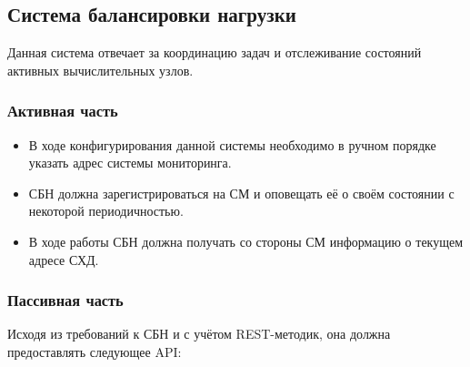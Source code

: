 \documentclass[a4paper,12pt]{report}
\numberwithin{equation}{section}
\begin{document}
  \subsection{Система балансировки нагрузки}
  Данная система отвечает за координацию задач и отслеживание состояний активных вычислительных узлов. 
  
  \subsubsection{Активная часть}
  \begin{itemize}
    \item В ходе конфигурирования данной системы необходимо в ручном порядке указать адрес системы мониторинга.
    \item СБН должна зарегистрироваться на СМ и оповещать её о своём состоянии с некоторой периодичностью.
    \item В ходе работы СБН должна получать со стороны СМ информацию о текущем адресе СХД.
  \end{itemize}
  
  \subsubsection{Пассивная часть}
  Исходя из требований к СБН и с учётом REST-методик, она должна предоставлять следующее API:
  
\end{document}
